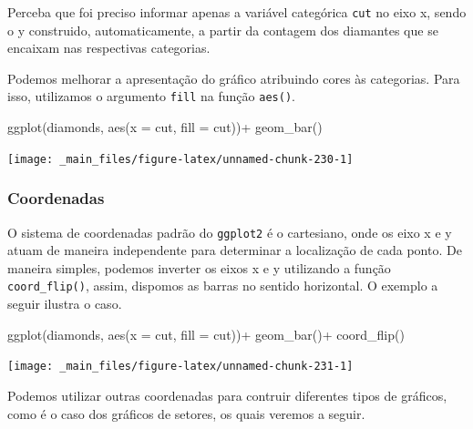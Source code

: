 \documentclass[
  brazilian,
]{book}
\newenvironment{Shaded}{\begin{snugshade}}{\end{snugshade}}
\newcommand{\AttributeTok}[1]{\textcolor[rgb]{0.77,0.63,0.00}{#1}}
\newcommand{\FunctionTok}[1]{\textcolor[rgb]{0.00,0.00,0.00}{#1}}
\newcommand{\NormalTok}[1]{#1}
\newcommand{\SpecialCharTok}[1]{\textcolor[rgb]{0.00,0.00,0.00}{#1}}
\begin{document}
Perceba que foi preciso informar apenas a variável categórica \texttt{cut} no eixo x, sendo o y construido, automaticamente, a partir da contagem dos diamantes que se encaixam nas respectivas categorias.

Podemos melhorar a apresentação do gráfico atribuindo cores às categorias. Para isso, utilizamos o argumento \texttt{fill} na função \texttt{aes()}.

\begin{Shaded}
\begin{Highlighting}[]
\FunctionTok{ggplot}\NormalTok{(diamonds,}
       \FunctionTok{aes}\NormalTok{(}\AttributeTok{x =}\NormalTok{ cut,}
           \AttributeTok{fill =}\NormalTok{ cut))}\SpecialCharTok{+}
  \FunctionTok{geom\_bar}\NormalTok{()}
\end{Highlighting}
\end{Shaded}

\begin{center}\texttt{[image: \_main\_files/figure-latex/unnamed-chunk-230-1]} \end{center}

\hypertarget{coordenadas}{%
\subsubsection{Coordenadas}\label{coordenadas}}

O sistema de coordenadas padrão do \texttt{ggplot2} é o cartesiano, onde os eixo x e y atuam de maneira independente para determinar a localização de cada ponto. De maneira simples, podemos inverter os eixos x e y utilizando a função \texttt{coord\_flip()}, assim, dispomos as barras no sentido horizontal. O exemplo a seguir ilustra o caso.

\begin{Shaded}
\begin{Highlighting}[]
\FunctionTok{ggplot}\NormalTok{(diamonds,}
       \FunctionTok{aes}\NormalTok{(}\AttributeTok{x =}\NormalTok{ cut,}
           \AttributeTok{fill =}\NormalTok{ cut))}\SpecialCharTok{+}
  \FunctionTok{geom\_bar}\NormalTok{()}\SpecialCharTok{+}
  \FunctionTok{coord\_flip}\NormalTok{()}
\end{Highlighting}
\end{Shaded}

\begin{center}\texttt{[image: \_main\_files/figure-latex/unnamed-chunk-231-1]} \end{center}

Podemos utilizar outras coordenadas para contruir diferentes tipos de gráficos, como é o caso dos gráficos de setores, os quais veremos a seguir.
\end{document}
